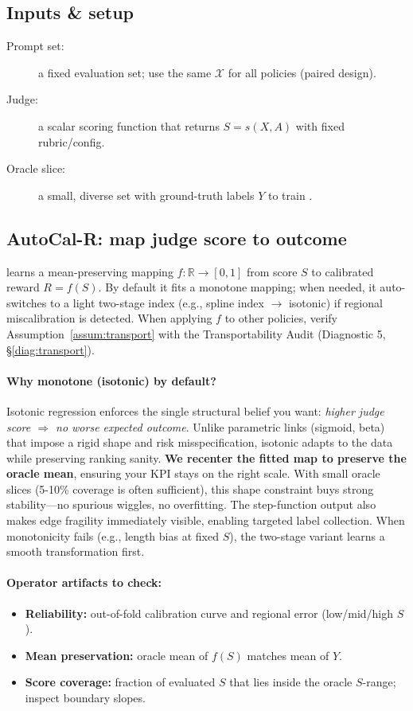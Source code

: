 \subsection{Inputs \& setup}

\begin{description}
\item[Prompt set:] a fixed evaluation set; use the same $\mathcal{X}$ for all policies (paired design).
\item[Judge:] a scalar scoring function that returns $S = s(X, A)$ with fixed rubric/config.
\item[Oracle slice:] a small, diverse set with ground-truth labels $Y$ to train \autocal.
\end{description}

\subsection{AutoCal-R: map judge score to outcome}

\autocal{} learns a mean-preserving mapping $f: \mathbb{R} \to [0,1]$ from score $S$ to calibrated reward $R = f(S)$. By default it fits a monotone mapping; when needed, it auto-switches to a light two-stage index (e.g., spline index $\to$ isotonic) if regional miscalibration is detected. When applying $f$ to other policies, verify Assumption~\ref{assum:transport} with the Transportability Audit (Diagnostic 5, \S\ref{diag:transport}).

\paragraph{Why monotone (isotonic) by default?} Isotonic regression enforces the single structural belief you want: \emph{higher judge score $\Rightarrow$ no worse expected outcome}. Unlike parametric links (sigmoid, beta) that impose a rigid shape and risk misspecification, isotonic adapts to the data while preserving ranking sanity. \textbf{We recenter the fitted map to preserve the oracle mean}, ensuring your KPI stays on the right scale. With small oracle slices (5-10\% coverage is often sufficient), this shape constraint buys strong stability---no spurious wiggles, no overfitting. The step-function output also makes edge fragility immediately visible, enabling targeted label collection. When monotonicity fails (e.g., length bias at fixed $S$), the two-stage variant learns a smooth transformation first.

\paragraph{Operator artifacts to check:}
\begin{itemize}
\item \textbf{Reliability:} out-of-fold calibration curve and regional error (low/mid/high $S$).
\item \textbf{Mean preservation:} oracle mean of $f(S)$ matches mean of $Y$.
\item \textbf{Score coverage:} fraction of evaluated $S$ that lies inside the oracle $S$-range; inspect boundary slopes.
\end{itemize}

